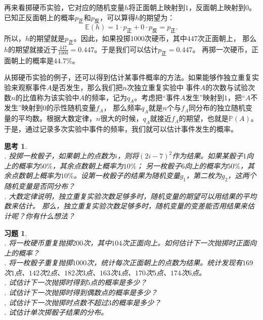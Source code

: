 \documentclass[12pt,UTF8]{ctexbook}
\newtheorem{sk}{思考}[section]
\newtheorem{xt}{习题}[section]
\begin{document}
再来看掷硬币实验，它对应的随机变量$h$将正面朝上映射到$1$，反面朝上映射到$0$。
已知正反面朝上的概率$p_{\text{正}}$和$p_{\text{反}}$，可以算得$h$的期望为：
$$ \mathbb{E}(h) = 1 \cdot p_{\text{正}} + 0 \cdot p_{\text{反}} = p_{\text{正}}.$$
所以，$h$的期望就是$p_{\text{正}}$。因此，如果投掷$1000$次硬币，其中$447$次正面朝上，
那么$h$的期望就接近于$\frac{447}{1000} = 0.447$。于是我们可以估计$p_{\text{正}} = 0.447$。
再掷一次硬币，正面朝上的概率是$44.7\%$。

从掷硬币实验的例子，还可以得到估计某事件概率的方法。如果能够作独立重复实验来观察事件$A$是否发生，那么我们把$n$次独立重复实验中
事件$A$的次数与试验次数$n$的比值称为该实验中$A$的频率，记为$q_A$。考虑把“事件$A$发生”映射到$1$，把“$A$不发生”映射到$0$的示性随机变量$f_A$，
那么频率$q_A$就是$n$个与$f_A$同分布的独立随机变量的平均数。根据大数定律，$n$很大的时候，$q_A$就接近$f_A$的期望，也就是$\mathbb{P}(A)$。
于是，通过记录多次实验中事件的频率，我们就可以估计事件发生的概率。

\begin{sk}
    \mbox{}\\
    . 投掷一枚骰子，如果朝上的点数为$i$，则将$(2i-7)^2$作为结果。如果某骰子$1$向上的概率为$50\%$，其余点数朝上概率为$10\%$；
    另一枚骰子$6$向上的概率为$50\%$，其余点数朝上概率为$10\%$。设第一枚骰子的结果为随机变量$g_1$，第二枚为$g_2$，这两个随机变量是否同分布？\\
    . 大数定律说明，独立重复实验次数足够多时，随机变量的期望可以用结果的平均数来估计。
    那么，独立重复实验次数足够多时，随机变量的变差能否用结果来估计呢？你有什么想法？
\end{sk}

\begin{xt}
    \mbox{}\\
    . 将一枚硬币重复抛掷$200$次，其中$104$次正面向上。如何估计下一次抛掷时正面向上的概率？\\
    . 将一枚骰子重复抛掷$1000$次，统计每次正面朝上的点数为结果。统计发现有$169$次$1$点、$142$次$2$点、$182$次$3$点、$163$次$4$点、$170$次$5$点、$174$次$6$点。\\
    . 试估计下一次抛掷时得到$5$点的概率是多少？\\
    . 试估计下一次抛掷时得到偶数点的概率是多少？\\
    . 试估计下一次抛掷时点数不超过$3$的概率是多少？\\
    . 试估计单次掷骰子结果的分布。
\end{xt}
\end{document}
